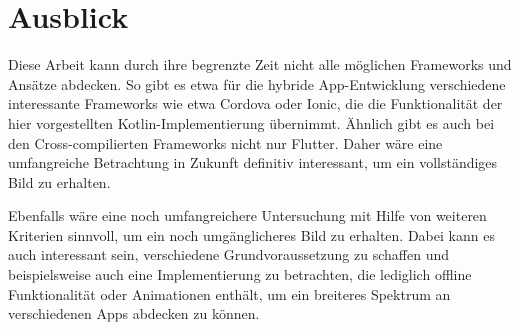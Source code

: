 

\section{Ausblick}
Diese Arbeit kann durch ihre begrenzte Zeit nicht alle möglichen Frameworks und Ansätze abdecken. So gibt es etwa für die hybride App-Entwicklung verschiedene interessante Frameworks wie etwa Cordova oder Ionic, die die Funktionalität der hier vorgestellten Kotlin-Implementierung übernimmt. Ähnlich gibt es auch bei den Cross-compilierten Frameworks nicht nur Flutter. Daher wäre eine umfangreiche Betrachtung in Zukunft definitiv interessant, um ein vollständiges Bild zu erhalten.

Ebenfalls wäre eine noch umfangreichere Untersuchung mit Hilfe von weiteren Kriterien sinnvoll, um ein noch umgänglicheres Bild zu erhalten. Dabei kann es auch interessant sein, verschiedene Grundvoraussetzung zu schaffen und beispielsweise auch eine Implementierung zu betrachten, die lediglich offline Funktionalität oder Animationen enthält, um ein breiteres Spektrum an verschiedenen Apps abdecken zu können.

